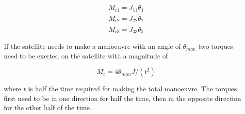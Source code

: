 \begin{eqnarray}
M_{c1} = J_{11}\ddot{\theta}_1 \\
M_{c2} = J_{22}\ddot{\theta}_2 \\
M_{c3} = J_{33}\ddot{\theta}_3 
\end{eqnarray}

If the satellite needs to make a manoeuvre with an angle of $\theta_{man}$ two torques need to be exerted on the satellite with a magnitude of

\begin{equation}
M_{c} = 4\theta_{man}J/(t^2)
\label{reqtorque}
\end{equation}

where $t$ is half the time required for making the total manoeuvre. The torques first need to be in one direction for half the time, then in the opposite direction for the other half of the time \cite{chu22}. 